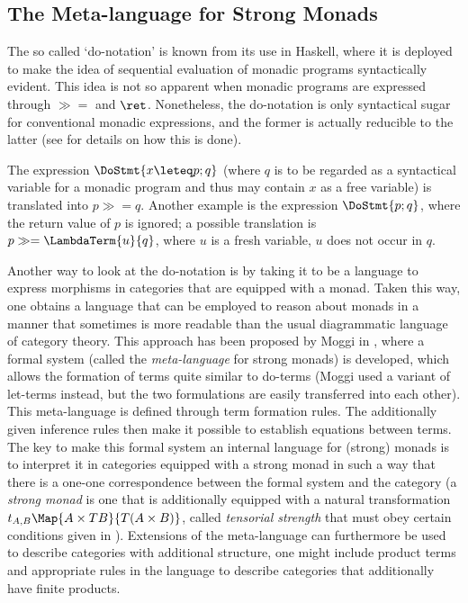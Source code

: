 \subsection{The Meta-language for Strong Monads}
\label{sec:metalanguage-monads}

The so called `do-notation' is known from its use in Haskell, where it is
deployed to make the idea of sequential evaluation of monadic programs
syntactically evident. This idea is not so apparent when monadic programs are
expressed through $\gg=$ and $\ret$.  Nonetheless, the do-notation is only
syntactical sugar for conventional monadic expressions, and the former is
actually reducible to the latter (see \cite{Haskell98} for details on how this
is done).
\begin{expl}
  The expression $\DoStmt{x\leteq p; q}$ (where $q$ is to be regarded as a
  syntactical variable for a monadic program and thus may contain $x$ as a free
  variable) is translated into $p \gg= q$. Another example is the expression
  $\DoStmt{p; q}$, where the return value of $p$ is ignored; a possible
  translation is $p \gg= \LambdaTerm{u}{q}$, where $u$ is a fresh variable, \IE $u$
  does not occur in $q$.
\end{expl}


Another way to look at the do-notation is by taking it to be a language to
express morphisms in categories that are equipped with a monad. Taken this way,
one obtains a language that can be employed to reason about monads in a manner
that sometimes is more readable than the usual diagrammatic language of category
theory. This approach has been proposed by Moggi in \cite{Moggi91}, where a
formal system (called the \emph{meta-language} for strong monads) is developed,
which allows the formation of terms quite similar to do-terms (Moggi used a
variant of let-terms instead, but the two formulations are easily transferred
into each other).  This meta-language is defined through term formation rules.
The additionally given inference rules then make it possible to establish
equations between terms. The key to make this formal system an internal language
for (strong) monads is to interpret it in categories equipped with a strong
monad in such a way that there is a one-one correspondence between the formal
system and the category (a \emph{strong monad} is one that is additionally
equipped with a natural transformation $t_{A,B} \Map{A \times T B}{T (A\times B)}$, called
\emph{tensorial strength} that must obey certain conditions given in
\cite{Moggi91}).  Extensions of the meta-language can furthermore be used to
describe categories with additional structure, \EG one might include product
terms and appropriate rules in the language to describe categories that
additionally have finite products.

